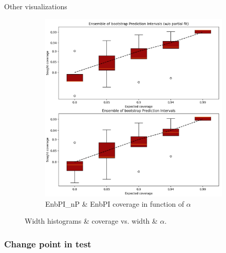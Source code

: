 \documentclass{beamer}
\renewcommand{\a}{\alpha}
\begin{document}
\begin{frame}{Other visualizations}
\begin{figure}[ht]
\begin{subfigure}[b]{0.32\textwidth}
            \includegraphics[width=1.05\textwidth, height=1.3\textwidth]{Figures/timeseries/without-change-point/coverage-vs-alpha-timeseries-problem.png} %
            \caption{EnbPI\_{}nP \& EnbPI coverage in function of $\a$}
        \end{subfigure}
        \caption{Width histograms \& coverage vs. width \& $\a$.}
    \end{figure}
\end{frame}


\subsubsection{Change point in test}
\end{document}
